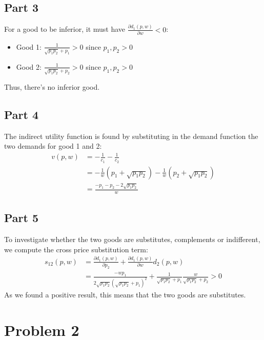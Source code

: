 \documentclass[12pt]{extarticle}
\numberwithin{table}{section}
\numberwithin{figure}{section}
\numberwithin{equation}{section}
\begin{document}
\subsection*{Part 3}
For a good to be inferior, it must have $\frac{\partial d_1(p,w)}{\partial w}<0$:
\begin{itemize}
    \item
          Good 1: $\frac{1}{\sqrt{p_1p_2}+p_1}>0$ since $p_1,p_2>0$
    \item
          Good 2: $\frac{1}{\sqrt{p_1p_2}+p_2}>0$ since $p_1,p_2>0$
\end{itemize}
Thus, there's no inferior good.

\subsection*{Part 4}
The indirect utility function is found by substituting in the demand function the two demands for good 1 and 2:
\begin{align}
    v(p,w) & = -\frac{1}{c_1}-\frac{1}{c_2}                                   \\
           & = -\frac{1}{w}(p_1+\sqrt{p_1p_2})-\frac{1}{w}(p_2+\sqrt{p_1p_2}) \\
           & = \frac{-p_1-p_2-2\sqrt{p_1p_2}}{w}
\end{align}

\subsection*{Part 5}
To investigate whether the two goods are substitutes, complements or indifferent, we compute the cross price substitution term:
\begin{align}
    s_{12}(p,w) & = \frac{\partial d_1(p,w)}{\partial p_2}+ \frac{\partial d_1(p,w)}{\partial w }d_2(p,w)                      \\
                & =\frac{-wp_1}{2\sqrt{p_1p_2}(\sqrt{p_1p_2}+p_1)^2}+ \frac{1}{\sqrt{p_1p_2}+p_1}\frac{w}{\sqrt{p_1p_2}+p_2}>0
\end{align}
As we found a positive result, this means that the two goods are substitutes.

\section*{Problem 2}
\end{document}
